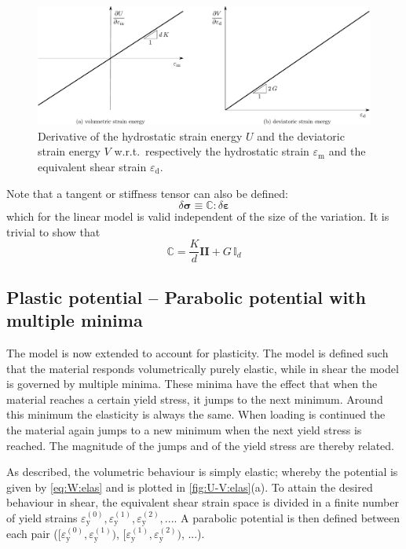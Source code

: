 \documentclass[fleqn]{goose-article}
\begin{document}
\begin{figure}[htp]
    \centering
    \includegraphics[width=1.\textwidth]{figures/potential_dU-dV_elas}
    \caption{
        Derivative of the hydrostatic strain energy $U$ and the deviatoric strain energy $V$
        w.r.t.\ respectively the hydrostatic strain $\varepsilon_\mathrm{m}$ and
        the equivalent shear strain $\varepsilon_\mathrm{d}$.}
    \label{fig:dU-dV:elas}
\end{figure}

Note that a tangent or stiffness tensor can also be defined:
\begin{equation}
    \delta \bm{\sigma} \equiv \mathbb{C} : \delta \bm{\varepsilon}
\end{equation}
which for the linear model is valid independent of the size of the variation.
It is trivial to show that
\begin{equation}
    \mathbb{C} = \frac{K}{d} \bm{I} \bm{I} + G \, \mathbb{I}_d
\end{equation}

\subsection{Plastic potential -- Parabolic potential with multiple minima}

The model is now extended to account for plasticity.
The model is defined such that the material responds volumetrically purely elastic,
while in shear the model is governed by multiple minima.
These minima have the effect that when the material reaches a certain yield stress,
it jumps to the next minimum.
Around this minimum the elasticity is always the same.
When loading is continued the the material again jumps to a new minimum
when the next yield stress is reached.
The magnitude of the jumps and of the yield stress are thereby related.

As described, the volumetric behaviour is simply elastic; whereby the potential is given by
\cref{eq:W:elas} and is plotted in \cref{fig:U-V:elas}(a).
To attain the desired behaviour in shear, the equivalent shear strain space is divided in a
finite number of yield strains $\varepsilon_\mathrm{y}^{(0)},
\varepsilon_\mathrm{y}^{(1)}, \varepsilon_\mathrm{y}^{(2)}, ...$.
A parabolic potential is then defined between each pair
($[ \varepsilon_\mathrm{y}^{(0)}, \varepsilon_\mathrm{y}^{(1)} )$,
 $[ \varepsilon_\mathrm{y}^{(1)}, \varepsilon_\mathrm{y}^{(2)} )$, ...).
\end{document}
